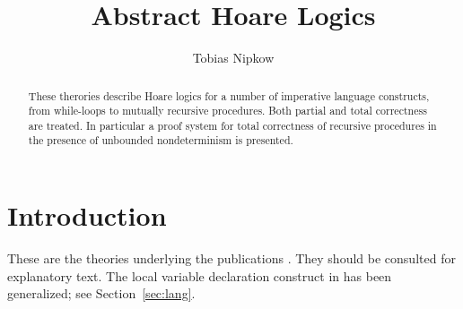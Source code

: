 \documentclass[11pt,a4paper]{article}
\begin{document}
\title{Abstract Hoare Logics}
\author{Tobias Nipkow}
\maketitle

\begin{abstract}
  These therories describe Hoare logics for a number of imperative
  language constructs, from while-loops to mutually
  recursive procedures. Both partial and total correctness are
  treated. In particular a proof system for total correctness of
  recursive procedures in the presence of unbounded nondeterminism is
  presented.
\end{abstract}

\tableofcontents

\section{Introduction}

These are the theories underlying the publications
\cite{Nipkow-MOD2001,Nipkow-CSL02}. They should be consulted for explanatory
text. The local variable declaration construct in \cite{Nipkow-MOD2001} has
been generalized; see Section~\ref{sec:lang}.





\end{document}
